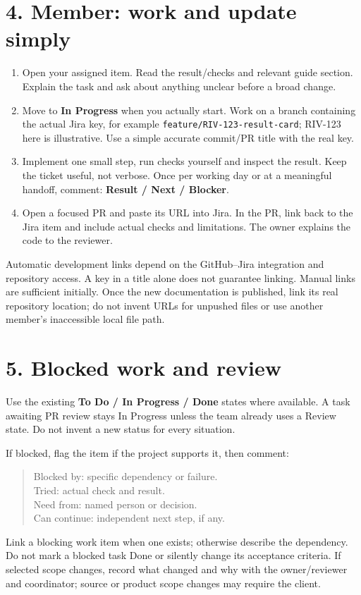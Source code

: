 \section*{4. Member: work and update simply}
\begin{enumerate}
\item Open your assigned item. Read the result/checks and relevant guide section. Explain the task and ask about anything unclear before a broad change.
\item Move to \textbf{In Progress} when you actually start. Work on a branch containing the actual Jira key, for example \texttt{feature/RIV-123-result-card}; RIV-123 here is illustrative. Use a simple accurate commit/PR title with the real key.
\item Implement one small step, run checks yourself and inspect the result. Keep the ticket useful, not verbose. Once per working day or at a meaningful handoff, comment: \textbf{Result / Next / Blocker}.
\item Open a focused PR and paste its URL into Jira. In the PR, link back to the Jira item and include actual checks and limitations. The owner explains the code to the reviewer.
\end{enumerate}
Automatic development links depend on the GitHub--Jira integration and repository access. A key in a title alone does not guarantee linking. Manual links are sufficient initially. Once the new documentation is published, link its real repository location; do not invent URLs for unpushed files or use another member's inaccessible local file path.

\newpage
\section*{5. Blocked work and review}
Use the existing \textbf{To Do / In Progress / Done} states where available. A task awaiting PR review stays In Progress unless the team already uses a Review state. Do not invent a new status for every situation.

If blocked, flag the item if the project supports it, then comment:
\begin{quote}
Blocked by: specific dependency or failure.\\
Tried: actual check and result.\\
Need from: named person or decision.\\
Can continue: independent next step, if any.
\end{quote}
Link a blocking work item when one exists; otherwise describe the dependency. Do not mark a blocked task Done or silently change its acceptance criteria. If selected scope changes, record what changed and why with the owner/reviewer and coordinator; source or product scope changes may require the client.

